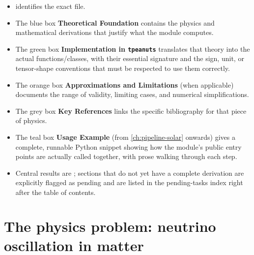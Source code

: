 \begin{itemize}
  \item {}
    identifies the exact file.
  \item The blue box \textbf{Theoretical Foundation} contains the physics and
    mathematical derivations that justify what the module computes.
  \item The green box \textbf{Implementation in \texttt{tpeanuts}} translates
    that theory into the actual functions/classes, with their essential
    signature and the sign, unit, or tensor-shape conventions that must be
    respected to use them correctly.
  \item The orange box \textbf{Approximations and Limitations} (when
    applicable) documents the range of validity, limiting cases, and
    numerical simplifications.
  \item The grey box \textbf{Key References} links the specific bibliography
    for that piece of physics.
  \item The teal box \textbf{Usage Example} (from \cref{ch:pipeline-solar}
    onwards) gives a complete, runnable Python snippet showing how the
    module's public entry points are actually called together, with prose
    walking through each step.
  \item Central results are ; sections that do not yet
    have a complete derivation are explicitly flagged as pending and are
    listed in the pending-tasks index right after the table of contents.
\end{itemize}

\section{The physics problem: neutrino oscillation in matter}

